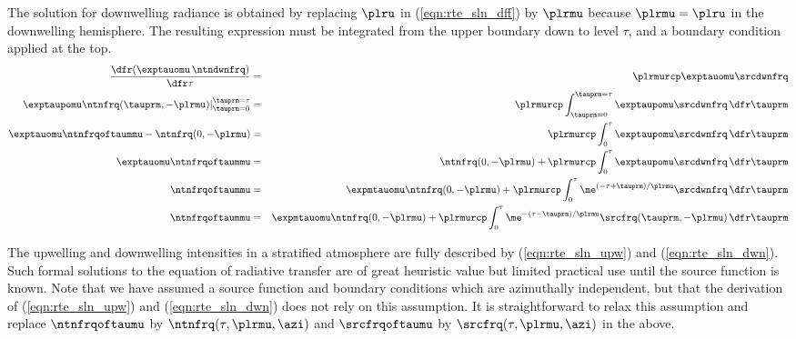 \documentclass[12pt]{article}
\begin{document}
The solution for downwelling radiance is obtained by replacing $\plru$
in (\ref{eqn:rte_sln_dff}) by $\plrmu$ because $\plrmu = \plru$ in the
downwelling hemisphere. 
The resulting expression must be integrated from the upper boundary 
down to level $\tau$, and a boundary condition applied at the top.
\begin{eqnarray}
\frac{\dfr( \exptauomu \, \ntndwnfrq )}{\dfr\tau} & = & \plrmurcp
\exptauomu \srcdwnfrq \nonumber \\
\left. 
\exptaupomu \ntnfrq(\tauprm,-\plrmu) 
\right|_{\tauprm = 0}^{\tauprm=\tau} 
& = & \plrmurcp \int_{\tauprm = 0}^{\tauprm=\tau} 
\exptaupomu \srcdwnfrq \,\dfr\tauprm \nonumber \\
\exptauomu \ntnfrqoftaummu - 
\ntnfrq(0,-\plrmu)
& = & \plrmurcp \int_{0}^{\tau} 
\exptaupomu \srcdwnfrq \,\dfr\tauprm \nonumber \\
\exptauomu \ntnfrqoftaummu  
& = & \ntnfrq(0,-\plrmu) +
\plrmurcp \int_{0}^{\tau} 
\exptaupomu \srcdwnfrq \,\dfr\tauprm \nonumber \\
\ntnfrqoftaummu  
& = & \expmtauomu \ntnfrq(0,-\plrmu) +
\plrmurcp \int_{0}^{\tau} 
\me^{(-\tau + \tauprm)/\plrmu} \srcdwnfrq \,\dfr\tauprm  \nonumber \\
\ntnfrqoftaummu  
& = & \expmtauomu \ntnfrq(0,-\plrmu) +
\plrmurcp \int_{0}^{\tau} 
\me^{-(\tau - \tauprm)/\plrmu} \srcfrq(\tauprm,-\plrmu) \,\dfr\tauprm
\label{eqn:rte_sln_dwn}
\end{eqnarray}

The upwelling and downwelling intensities in a stratified atmosphere
are fully described by (\ref{eqn:rte_sln_upw}) and
(\ref{eqn:rte_sln_dwn}). 
Such formal solutions to the equation of radiative transfer are of
great heuristic value but limited practical use until the source
function is known. 
Note that we have assumed a source function and boundary conditions
which are azimuthally independent, but that the derivation of
(\ref{eqn:rte_sln_upw}) and (\ref{eqn:rte_sln_dwn}) does not 
rely on this assumption. 
It is straightforward to relax this assumption and replace
$\ntnfrqoftaumu$ by $\ntnfrq(\tau,\plrmu,\azi)$ and 
$\srcfrqoftaumu$ by $\srcfrq(\tau,\plrmu,\azi)$ in the above.  
\end{document}
